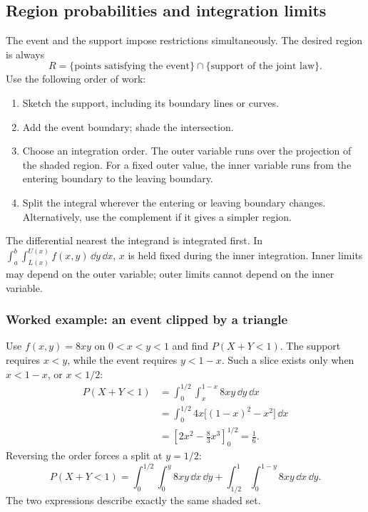 \subsection{Region probabilities and integration limits}

The event and the support impose restrictions simultaneously. The desired region is always
\[
 R=\{\text{points satisfying the event}\}\cap\{\text{support of the joint law}\}.
\]
Use the following order of work:
\begin{enumerate}[leftmargin=*]
\item Sketch the support, including its boundary lines or curves.
\item Add the event boundary; shade the intersection.
\item Choose an integration order. The outer variable runs over the projection of the shaded region. For a fixed outer value, the inner variable runs from the entering boundary to the leaving boundary.
\item Split the integral wherever the entering or leaving boundary changes. Alternatively, use the complement if it gives a simpler region.
\end{enumerate}
The differential nearest the integrand is integrated first. In
$\int_a^b\int_{L(x)}^{U(x)}f(x,y)\,\dd y\,\dd x$, $x$ is held fixed during the inner integration. Inner limits may depend on the outer variable; outer limits cannot depend on the inner variable.

\subsubsection*{Worked example: an event clipped by a triangle}
Use $f(x,y)=8xy$ on $0<x<y<1$ and find $P(X+Y<1)$. The support requires $x<y$, while the event requires $y<1-x$. Such a slice exists only when $x<1-x$, or $x<1/2$:
\[
\begin{aligned}
P(X+Y<1)
&=\int_0^{1/2}\int_x^{1-x}8xy\,\dd y\,\dd x\\
&=\int_0^{1/2}4x\bigl[(1-x)^2-x^2\bigr]\,\dd x\\
&=\left[2x^2-\frac83x^3\right]_0^{1/2}=\frac16.
\end{aligned}
\]
Reversing the order forces a split at $y=1/2$:
\[
 P(X+Y<1)
 =\int_0^{1/2}\int_0^y8xy\,\dd x\,\dd y
 +\int_{1/2}^1\int_0^{1-y}8xy\,\dd x\,\dd y.
\]
The two expressions describe exactly the same shaded set.

\begin{center}
\end{center}

